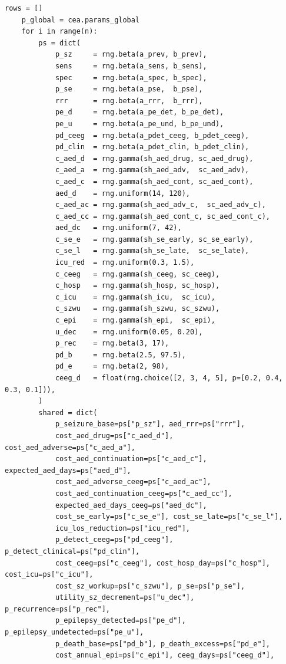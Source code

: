 \documentclass[11pt,a4paper]{article}
\begin{document}
\begin{lstlisting}[style=codeblock]
    rows = []
    p_global = cea.params_global
    for i in range(n):
        ps = dict(
            p_sz     = rng.beta(a_prev, b_prev),
            sens     = rng.beta(a_sens, b_sens),
            spec     = rng.beta(a_spec, b_spec),
            p_se     = rng.beta(a_pse,  b_pse),
            rrr      = rng.beta(a_rrr,  b_rrr),
            pe_d     = rng.beta(a_pe_det, b_pe_det),
            pe_u     = rng.beta(a_pe_und, b_pe_und),
            pd_ceeg  = rng.beta(a_pdet_ceeg, b_pdet_ceeg),
            pd_clin  = rng.beta(a_pdet_clin, b_pdet_clin),
            c_aed_d  = rng.gamma(sh_aed_drug, sc_aed_drug),
            c_aed_a  = rng.gamma(sh_aed_adv,  sc_aed_adv),
            c_aed_c  = rng.gamma(sh_aed_cont, sc_aed_cont),
            aed_d    = rng.uniform(14, 120),
            c_aed_ac = rng.gamma(sh_aed_adv_c,  sc_aed_adv_c),
            c_aed_cc = rng.gamma(sh_aed_cont_c, sc_aed_cont_c),
            aed_dc   = rng.uniform(7, 42),
            c_se_e   = rng.gamma(sh_se_early, sc_se_early),
            c_se_l   = rng.gamma(sh_se_late,  sc_se_late),
            icu_red  = rng.uniform(0.3, 1.5),
            c_ceeg   = rng.gamma(sh_ceeg, sc_ceeg),
            c_hosp   = rng.gamma(sh_hosp, sc_hosp),
            c_icu    = rng.gamma(sh_icu,  sc_icu),
            c_szwu   = rng.gamma(sh_szwu, sc_szwu),
            c_epi    = rng.gamma(sh_epi,  sc_epi),
            u_dec    = rng.uniform(0.05, 0.20),
            p_rec    = rng.beta(3, 17),
            pd_b     = rng.beta(2.5, 97.5),
            pd_e     = rng.beta(2, 98),
            ceeg_d   = float(rng.choice([2, 3, 4, 5], p=[0.2, 0.4, 0.3, 0.1])),
        )
        shared = dict(
            p_seizure_base=ps["p_sz"], aed_rrr=ps["rrr"],
            cost_aed_drug=ps["c_aed_d"], cost_aed_adverse=ps["c_aed_a"],
            cost_aed_continuation=ps["c_aed_c"], expected_aed_days=ps["aed_d"],
            cost_aed_adverse_ceeg=ps["c_aed_ac"],
            cost_aed_continuation_ceeg=ps["c_aed_cc"],
            expected_aed_days_ceeg=ps["aed_dc"],
            cost_se_early=ps["c_se_e"], cost_se_late=ps["c_se_l"],
            icu_los_reduction=ps["icu_red"],
            p_detect_ceeg=ps["pd_ceeg"], p_detect_clinical=ps["pd_clin"],
            cost_ceeg=ps["c_ceeg"], cost_hosp_day=ps["c_hosp"], cost_icu=ps["c_icu"],
            cost_sz_workup=ps["c_szwu"], p_se=ps["p_se"],
            utility_sz_decrement=ps["u_dec"], p_recurrence=ps["p_rec"],
            p_epilepsy_detected=ps["pe_d"], p_epilepsy_undetected=ps["pe_u"],
            p_death_base=ps["pd_b"], p_death_excess=ps["pd_e"],
            cost_annual_epi=ps["c_epi"], ceeg_days=ps["ceeg_d"],

\end{lstlisting}
\end{document}
